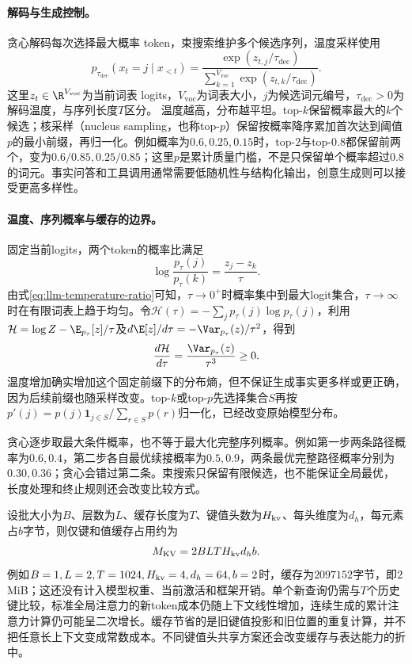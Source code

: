 \paragraph{解码与生成控制。}
贪心解码每次选择最大概率 token，束搜索维护多个候选序列，温度采样使用
\begin{equation}
 p_{\tau_{\mathrm{dec}}}(x_t=j\mid x_{<t})
 =\frac{\exp(z_{t,j}/\tau_{\mathrm{dec}})}{\sum_{k=1}^{V_{\mathrm{voc}}}\exp(z_{t,k}/\tau_{\mathrm{dec}})}.
\end{equation}
这里$z_t\in\R^{V_{\mathrm{voc}}}$为当前词表 logits，$V_{\mathrm{voc}}$为词表大小，$j$为候选词元编号，$\tau_{\mathrm{dec}}>0$为解码温度，与序列长度$T$区分。
温度越高，分布越平坦。top-$k$保留概率最大的$k$个候选；核采样（nucleus sampling，也称top-$p$）保留按概率降序累加首次达到阈值$p$的最小前缀，再归一化。例如概率为$0.6,0.25,0.15$时，top-$2$与top-$0.8$都保留前两个，变为$0.6/0.85,0.25/0.85$；这里$p$是累计质量门槛，不是只保留单个概率超过$0.8$的词元。事实问答和工具调用通常需要低随机性与结构化输出，创意生成则可以接受更高多样性。

\paragraph{温度、序列概率与缓存的边界。}
固定当前logits，两个token的概率比满足
\begin{equation}
 \log\frac{p_\tau(j)}{p_\tau(k)}=\frac{z_j-z_k}{\tau}.\label{eq:llm-temperature-ratio}
\end{equation}
由式\eqref{eq:llm-temperature-ratio}可知，$\tau\to0^+$时概率集中到最大logit集合，$\tau\to\infty$时在有限词表上趋于均匀。令$\mathcal H(\tau)=-\sum_jp_\tau(j)\log p_\tau(j)$，利用$\mathcal H=\log Z-\E_{p_\tau}[z]/\tau$及$d\E[z]/d\tau=-\Var_{p_\tau}(z)/\tau^2$，得到
\begin{equation}
 \frac{d\mathcal H}{d\tau}=\frac{\Var_{p_\tau}(z)}{\tau^3}\geq0.
\end{equation}
温度增加确实增加这个固定前缀下的分布熵，但不保证生成事实更多样或更正确，因为后续前缀也随采样改变。top-$k$或top-$p$先选择集合$S$再按$p'(j)=p(j)\mathbf1_{j\in S}/\sum_{r\in S}p(r)$归一化，已经改变原始模型分布。

贪心逐步取最大条件概率，也不等于最大化完整序列概率。例如第一步两条路径概率为$0.6,0.4$，第二步各自最优续接概率为$0.5,0.9$，两条最优完整路径概率分别为$0.30,0.36$；贪心会错过第二条。束搜索只保留有限候选，也不能保证全局最优，长度处理和终止规则还会改变比较方式。

设批大小为$B$、层数为$L$、缓存长度为$T$、键值头数为$H_{\rm kv}$、每头维度为$d_h$，每元素占$b$字节，则仅键和值缓存占用约为
\begin{equation}
 M_{\rm KV}=2BLTH_{\rm kv}d_hb.
\end{equation}
例如$B=1,L=2,T=1024,H_{\rm kv}=4,d_h=64,b=2$时，缓存为$2097152$字节，即$2$ MiB；这还没有计入模型权重、当前激活和框架开销。单个新查询仍需与$T$个历史键比较，标准全局注意力的新token成本仍随上下文线性增加，连续生成的累计注意力计算仍可能呈二次增长。缓存节省的是旧键值投影和旧位置的重复计算，并不把任意长上下文变成常数成本。不同键值头共享方案还会改变缓存与表达能力的折中。

